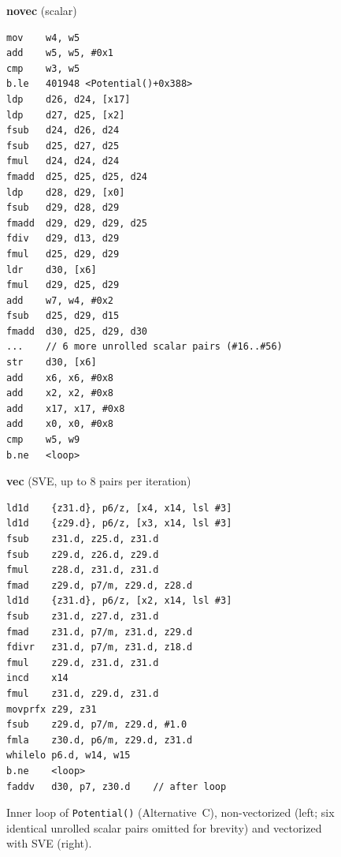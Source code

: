 \documentclass[conference]{IEEEtran}
\begin{document}
\begin{figure}[!t]
\centering
\begin{minipage}[t]{0.42\textwidth}
\footnotesize
\textbf{novec} (scalar)
\begin{verbatim}
mov    w4, w5
add    w5, w5, #0x1
cmp    w3, w5
b.le   401948 <Potential()+0x388>
ldp    d26, d24, [x17]
ldp    d27, d25, [x2]
fsub   d24, d26, d24
fsub   d25, d27, d25
fmul   d24, d24, d24
fmadd  d25, d25, d25, d24
ldp    d28, d29, [x0]
fsub   d29, d28, d29
fmadd  d29, d29, d29, d25
fdiv   d29, d13, d29
fmul   d25, d29, d29
ldr    d30, [x6]
fmul   d29, d25, d29
add    w7, w4, #0x2
fsub   d25, d29, d15
fmadd  d30, d25, d29, d30
...    // 6 more unrolled scalar pairs (#16..#56)
str    d30, [x6]
add    x6, x6, #0x8
add    x2, x2, #0x8
add    x17, x17, #0x8
add    x0, x0, #0x8
cmp    w5, w9
b.ne   <loop>
\end{verbatim}
\end{minipage}
\hfill
\begin{minipage}[t]{0.52\textwidth}
\footnotesize
\textbf{vec} (SVE, up to 8 pairs per iteration)
\begin{verbatim}
ld1d    {z31.d}, p6/z, [x4, x14, lsl #3]
ld1d    {z29.d}, p6/z, [x3, x14, lsl #3]
fsub    z31.d, z25.d, z31.d
fsub    z29.d, z26.d, z29.d
fmul    z28.d, z31.d, z31.d
fmad    z29.d, p7/m, z29.d, z28.d
ld1d    {z31.d}, p6/z, [x2, x14, lsl #3]
fsub    z31.d, z27.d, z31.d
fmad    z31.d, p7/m, z31.d, z29.d
fdivr   z31.d, p7/m, z31.d, z18.d
fmul    z29.d, z31.d, z31.d
incd    x14
fmul    z31.d, z29.d, z31.d
movprfx z29, z31
fsub    z29.d, p7/m, z29.d, #1.0
fmla    z30.d, p6/m, z29.d, z31.d
whilelo p6.d, w14, w15
b.ne    <loop>
faddv   d30, p7, z30.d    // after loop
\end{verbatim}
\end{minipage}
\caption{Inner loop of \texttt{Potential()} (Alternative~C),
non-vectorized (left; six identical unrolled scalar pairs omitted for
brevity) and vectorized with SVE (right).}
\label{fig:asm-b-potential}
\end{figure}
\end{document}
